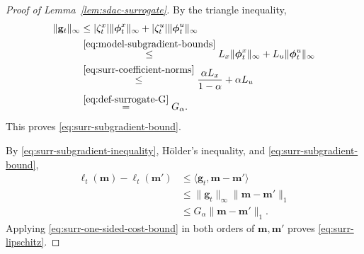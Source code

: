 \documentclass[journal]{IEEEtran}
\theoremstyle{remark}
\begin{document}
\begin{proof}[Proof of Lemma~\ref{lem:sdac-surrogate}]
By the triangle inequality,
\begin{align*}
\|\mathbf{g}_t\|_\infty
&\le
|\zeta_t^x|\|\boldsymbol{\phi}_t^x\|_\infty
+|\zeta_t^u|\|\boldsymbol{\phi}_t^u\|_\infty \\
&\overset{\eqref{eq:model-subgradient-bounds}}{\le}
L_x\|\boldsymbol{\phi}_t^x\|_\infty
+L_u\|\boldsymbol{\phi}_t^u\|_\infty\\
&\overset{\eqref{eq:surr-coefficient-norms}}{\le}
\frac{\alpha L_x}{1-\alpha}+\alpha L_u \\
&\overset{\eqref{eq:def-surrogate-G}}{=}G_\alpha.
\end{align*}
This proves \eqref{eq:surr-subgradient-bound}.

By \eqref{eq:surr-subgradient-inequality}, H\"older's inequality, and
\eqref{eq:surr-subgradient-bound},
\begin{equation}
\label{eq:surr-one-sided-cost-bound}
\begin{aligned}
\ell_t(\mathbf{m})-\ell_t(\mathbf{m}')
&\le\langle\mathbf{g}_t,\mathbf{m}-\mathbf{m}'\rangle\\
&\le\|\mathbf{g}_t\|_\infty\|\mathbf{m}-\mathbf{m}'\|_1\\
&\le G_\alpha\|\mathbf{m}-\mathbf{m}'\|_1.
\end{aligned}
\end{equation}
Applying \eqref{eq:surr-one-sided-cost-bound} in both orders of
$\mathbf{m},\mathbf{m}'$ proves \eqref{eq:surr-lipschitz}.
\end{proof}
\end{document}
